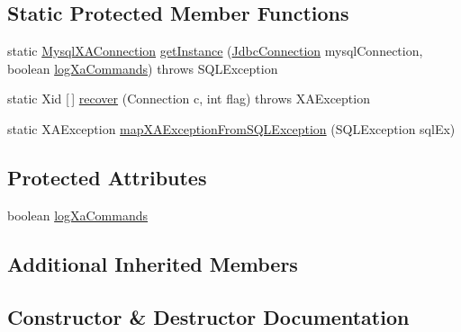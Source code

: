 \subsection*{Static Protected Member Functions}
\begin{DoxyCompactItemize}
\item 
static \mbox{\hyperlink{classcom_1_1mysql_1_1cj_1_1jdbc_1_1_mysql_x_a_connection}{Mysql\+X\+A\+Connection}} \mbox{\hyperlink{classcom_1_1mysql_1_1cj_1_1jdbc_1_1_mysql_x_a_connection_a66a8ed0f398150a2042c39f56befe824}{get\+Instance}} (\mbox{\hyperlink{interfacecom_1_1mysql_1_1cj_1_1jdbc_1_1_jdbc_connection}{Jdbc\+Connection}} mysql\+Connection, boolean \mbox{\hyperlink{classcom_1_1mysql_1_1cj_1_1jdbc_1_1_mysql_x_a_connection_a9e3e1df1f4dee55cf52612e8fe85eabf}{log\+Xa\+Commands}})  throws S\+Q\+L\+Exception 
\item 
static Xid \mbox{[}$\,$\mbox{]} \mbox{\hyperlink{classcom_1_1mysql_1_1cj_1_1jdbc_1_1_mysql_x_a_connection_af6946cf76a2c471c7fefa2ec712b4994}{recover}} (Connection c, int flag)  throws X\+A\+Exception 
\item 
static X\+A\+Exception \mbox{\hyperlink{classcom_1_1mysql_1_1cj_1_1jdbc_1_1_mysql_x_a_connection_a6be66ae9e7a01d3cabda0e0a55d66514}{map\+X\+A\+Exception\+From\+S\+Q\+L\+Exception}} (S\+Q\+L\+Exception sql\+Ex)
\end{DoxyCompactItemize}
\subsection*{Protected Attributes}
\begin{DoxyCompactItemize}
\item 
boolean \mbox{\hyperlink{classcom_1_1mysql_1_1cj_1_1jdbc_1_1_mysql_x_a_connection_a9e3e1df1f4dee55cf52612e8fe85eabf}{log\+Xa\+Commands}}
\end{DoxyCompactItemize}
\subsection*{Additional Inherited Members}


\subsection{Constructor \& Destructor Documentation}
\mbox{\label{classcom_1_1mysql_1_1cj_1_1jdbc_1_1_mysql_x_a_connection_ab6bc1b1d3cad547e542c44bdc591e581}} 
